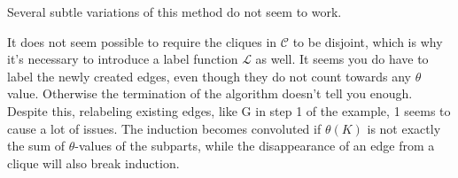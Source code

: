 \documentclass[11pt]{scrartcl}
\begin{document}
\begin{remark*}
  Several subtle variations of this method do not seem to work.
  \begin{itemize}
    \ii It does not seem possible to require the cliques in $\mathcal C$
    to be disjoint, which is why it's necessary to introduce
    a label function $\mathcal L$ as well.
    \ii It seems you do have to label the newly created edges,
    even though they do not count towards any $\theta$ value.
    Otherwise the termination of the algorithm doesn't tell you enough.
    \ii Despite this, relabeling existing edges,
    like G in step 1 of the example, 1 seems to cause a lot of issues.
    The induction becomes convoluted if $\theta(K)$ is not exactly
    the sum of $\theta$-values of the subparts,
    while the disappearance of an edge from a clique
    will also break induction.
  \end{itemize}
\end{remark*}
\pagebreak
\end{document}
